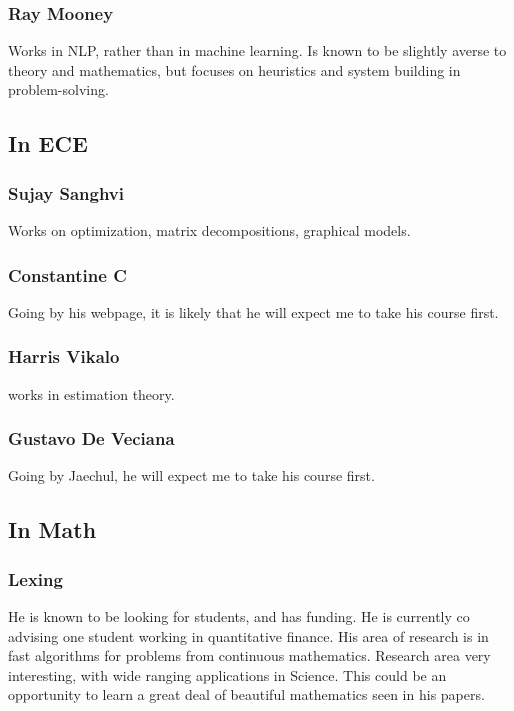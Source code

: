 \documentclass[oneside, article]{memoir}
\begin{document}
\subsubsection{Ray Mooney}
Works in NLP, rather than in machine learning. Is known to be slightly averse to theory and mathematics, but focuses on heuristics and system building in problem-solving.

\subsection{In ECE}

\subsubsection{Sujay Sanghvi}
Works on optimization, matrix decompositions, graphical models.

\subsubsection{Constantine C}
Going by his webpage, it is likely that he will expect me to take his course first.

\subsubsection{Harris Vikalo}
works in estimation theory.

\subsubsection{Gustavo De Veciana}
Going by Jaechul, he will expect me to take his course first.

\subsection{In Math}

\subsubsection{Lexing}

He is known to be looking for students, and has funding. He is currently co advising one student working in quantitative finance. His area of research is in fast algorithms for problems from continuous mathematics. Research area very interesting, with wide ranging applications in Science. This could be an opportunity to learn a great deal of beautiful mathematics seen in his papers.
\end{document}
